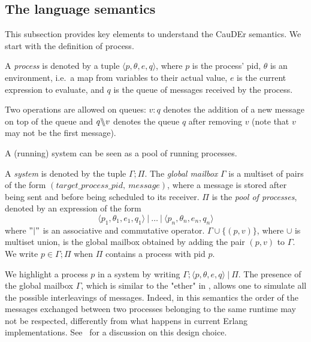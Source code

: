 \documentclass[runningheads]{llncs}
\newcommand{\sslash}{\mathbin{\mkern-4mu \backslash \mkern-6mu \backslash \mkern-4mu}}
\newcommand{\comp}{\:|\:}
\let\l=\langle
\let\r=\rangle
\begin{document}
\subsection{The language semantics}

This subsection provides key elements to understand the CauDEr semantics.
We start with the definition of process.

\begin{definition}[Process]\label{def:proc}
A \emph{process} is denoted by a tuple $\l p, \theta, e, q \r$, where $p$ is the process' pid, $\theta$ is an environment, i.e.\ a map from variables to their actual value, $e$ is the current expression to evaluate, and $q$ is the queue of messages received by the process.

Two operations are allowed on queues: $v:q$ denotes the addition of a new message on top of the queue and $q \sslash v$ denotes the queue $q$ after removing $v$ (note that $v$ may not be the first message). 
\end{definition}

A (running) system can be seen as a pool of running processes.

\begin{definition}[System]
A \emph{system} is denoted by the tuple $\Gamma; \Pi$. The \emph{global mailbox} $\Gamma$ is a multiset of pairs of the form $(target\_process\_pid,~message)$, where a message is stored after being sent and before being scheduled to its receiver. $\Pi$ is the \emph{pool of processes}, denoted by an expression of the form 
\[ \l p_1, \theta_1, e_1, q_1 \r \comp \ldots \comp \l p_n, \theta_n, e_n, q_n \r\]
where $"|"$ is an associative and commutative operator.
$\Gamma \cup \{(p,v)\}$, where $\cup$ is multiset union, is the global mailbox obtained by adding the pair $(p,v)$ to $\Gamma$.
We write $p \in \Gamma; \Pi$ when $\Pi$ contains a process with pid $p$.
\end{definition}

We highlight a process $p$ in a system by writing $\Gamma; \l p, \theta,e, q\r \comp \Pi$.
The presence of the global mailbox $\Gamma$, which is similar to the "ether" in \cite{unif-sem-erl}, allows one to simulate all the possible interleavings of messages. Indeed, in this semantics the order of the messages exchanged between two processes belonging to the same runtime may not be respected, differently from what happens in current Erlang implementations. See~\cite{unif-sem-erl} for a discussion on this design choice.
\end{document}
